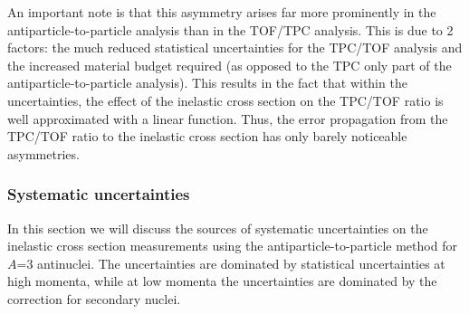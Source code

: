 An important note is that this asymmetry arises far more prominently in the antiparticle-to-particle analysis than in the TOF/TPC analysis. This is due to 2 factors: the much reduced statistical uncertainties for the TPC/TOF analysis and the increased material budget required (as opposed to the TPC only part of the antiparticle-to-particle analysis). This results in the fact that within the uncertainties, the effect of the inelastic cross section on the TPC/TOF ratio is well approximated with a linear function. Thus, the error propagation from the TPC/TOF ratio to the inelastic cross section has only barely noticeable asymmetries. 


\subsubsection{Systematic uncertainties}\label{sec:Meth:Systematics}
In this section we will discuss the sources of systematic uncertainties on the inelastic cross section measurements using the antiparticle-to-particle method for $A$=3 antinuclei. The uncertainties are dominated by statistical uncertainties at high momenta, while at low momenta the uncertainties are dominated by the correction for secondary nuclei. \\

